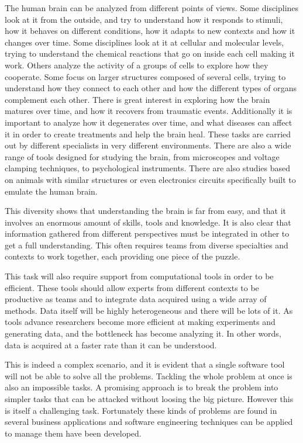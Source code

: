 
The human brain can be analyzed from different points of views. Some disciplines look at it from the outside, and try to understand how it responds to stimuli, how it behaves on different conditions, how it adapts to new contexts and how it changes over time. Some disciplines look at it at cellular and molecular levels, trying to understand the chemical reactions that go on inside each cell making it work. Others analyze the activity of a groups of cells to explore how they cooperate. Some focus on larger structures composed of several cells, trying to understand how they connect to each other and how the different types of organs complement each other. There is great interest in exploring how the brain matures over time, and how it recovers from traumatic events. Additionally it is important to analyze how it degenerates over time, and what diseases can affect it in order to create treatments and help the brain heal. 
These tasks are carried out by different specialists in very different environments. There are also a wide range of tools designed for studying the brain, from microscopes and voltage clamping techniques, to psychological instruments. There are also studies based on animals with similar structures or even electronics circuits specifically built to emulate the human brain. 

This diversity shows that understanding the brain is far from easy, and that it involves an enormous amount of skills, tools and knowledge. It is also clear that  information gathered from different perspectives must be integrated in other to get a full understanding. This often requires teams from diverse specialties and contexts to work together, each providing one piece of the puzzle. 

This task will also require support from computational tools in order to be efficient. These tools should allow experts from different contexts to be productive as teams and to integrate data acquired using a wide array of methods. Data itself will be highly heterogeneous and there will be lots of it. As tools advance researchers become more efficient at making experiments and generating data, and the bottleneck has become analyzing it. In other words, data is acquired at a faster rate than it can be understood. 

This is indeed a complex scenario, and it is evident that a single software tool will not be able to solve all the problems. Tackling the whole problem at once is also an impossible tasks. A promising approach is to break the problem into simpler tasks that can be attacked without loosing the big picture. However this is itself a challenging task. Fortunately these kinds of problems are found in several business applications and  software engineering techniques can be applied to manage them have been developed. 

